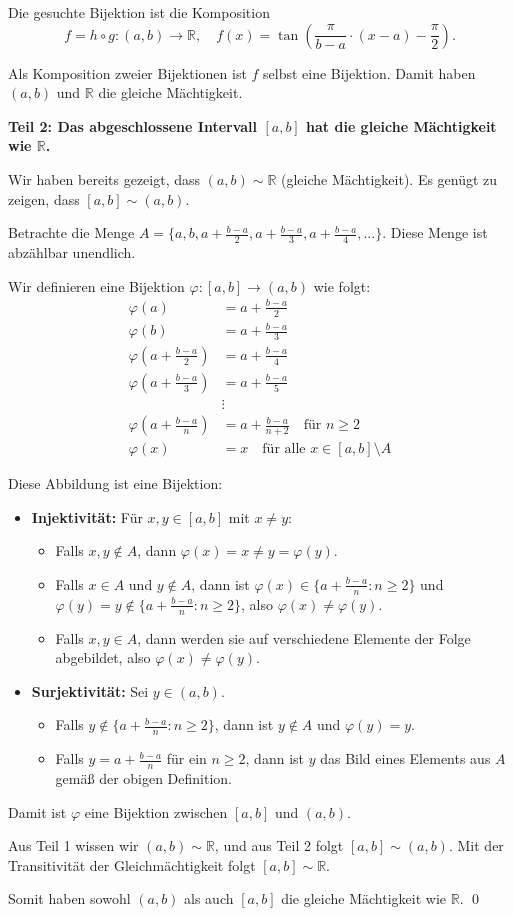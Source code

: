 \documentclass[11pt,a4paper]{article}
\newcommand{\R}{\mathbb{R}}
\begin{document}
Die gesuchte Bijektion ist die Komposition
$$f = h \circ g: (a,b) \to \R, \quad f(x) = \tan\left(\frac{\pi}{b-a} \cdot (x - a) - \frac{\pi}{2}\right).$$

Als Komposition zweier Bijektionen ist $f$ selbst eine Bijektion. Damit haben $(a,b)$ und $\R$ die gleiche Mächtigkeit.

\textbf{Teil 2: Das abgeschlossene Intervall $[a,b]$ hat die gleiche Mächtigkeit wie $\R$.}

Wir haben bereits gezeigt, dass $(a,b) \sim \R$ (gleiche Mächtigkeit). Es genügt zu zeigen, dass $[a,b] \sim (a,b)$.

Betrachte die Menge $A = \{a, b, a + \frac{b-a}{2}, a + \frac{b-a}{3}, a + \frac{b-a}{4}, \ldots\}$. Diese Menge ist abzählbar unendlich.

Wir definieren eine Bijektion $\varphi: [a,b] \to (a,b)$ wie folgt:
\begin{align}
\varphi(a) &= a + \frac{b-a}{2}\\
\varphi(b) &= a + \frac{b-a}{3}\\
\varphi\left(a + \frac{b-a}{2}\right) &= a + \frac{b-a}{4}\\
\varphi\left(a + \frac{b-a}{3}\right) &= a + \frac{b-a}{5}\\
&\vdots\\
\varphi\left(a + \frac{b-a}{n}\right) &= a + \frac{b-a}{n+2} \quad \text{für } n \geq 2\\
\varphi(x) &= x \quad \text{für alle } x \in [a,b] \setminus A
\end{align}

Diese Abbildung ist eine Bijektion:
\begin{itemize}
\item \textbf{Injektivität:} Für $x, y \in [a,b]$ mit $x \neq y$:
  \begin{itemize}
  \item Falls $x, y \notin A$, dann $\varphi(x) = x \neq y = \varphi(y)$.
  \item Falls $x \in A$ und $y \notin A$, dann ist $\varphi(x) \in \{a + \frac{b-a}{n} : n \geq 2\}$ und $\varphi(y) = y \notin \{a + \frac{b-a}{n} : n \geq 2\}$, also $\varphi(x) \neq \varphi(y)$.
  \item Falls $x, y \in A$, dann werden sie auf verschiedene Elemente der Folge abgebildet, also $\varphi(x) \neq \varphi(y)$.
  \end{itemize}
  
\item \textbf{Surjektivität:} Sei $y \in (a,b)$.
  \begin{itemize}
  \item Falls $y \notin \{a + \frac{b-a}{n} : n \geq 2\}$, dann ist $y \notin A$ und $\varphi(y) = y$.
  \item Falls $y = a + \frac{b-a}{n}$ für ein $n \geq 2$, dann ist $y$ das Bild eines Elements aus $A$ gemäß der obigen Definition.
  \end{itemize}
\end{itemize}

Damit ist $\varphi$ eine Bijektion zwischen $[a,b]$ und $(a,b)$.

Aus Teil 1 wissen wir $(a,b) \sim \R$, und aus Teil 2 folgt $[a,b] \sim (a,b)$. 
Mit der Transitivität der Gleichmächtigkeit folgt $[a,b] \sim \R$.

Somit haben sowohl $(a,b)$ als auch $[a,b]$ die gleiche Mächtigkeit wie $\R$. \qed
\end{document}
